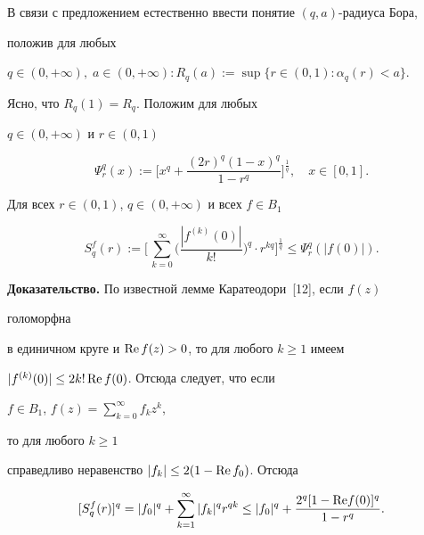 В связи с предложением естественно ввести понятие $(q,a)$-радиуса Бора,


положив для любых


$q\in(0, +\infty),\; a\in(0,+\infty):


R_q(a):=\sup\{r\in(0,1):\alpha_q(r)<a\}$.


Ясно, что $R_q(1)=R_q$. Положим для любых


$q\in(0,+\infty)$ и $r\in(0,1)$


$$


\Psi^{q}_{r}(x):=\bigg[x^q+\frac{(2r)^q(1-x)^q}{1-r^q}\bigg]^


{\frac{1}{q}}, \quad x\in[0,1].


$$





\begin{thm}


Для всех $r\in(0,1)$, $q\in(0,+\infty)$ и всех $f\in B_1$


\begin{equation}


S^f_q(r):=\bigg[\,\sum^{\infty}_{k=0}


\bigg(\frac{|f^{(k)}(0)|}{k!}\bigg)^{q}\cdot r^{kq}\bigg]^{\frac{1}{q}}


\leq\Psi^q_r(|f(0)|).


\end{equation}


\end{thm}





{\bf Доказательство.} По известной лемме Каратеодори~[12], если $f(z)$


голоморфна


в единичном круге и $\operatorname{Re} f(z)>0$, то для любого $k\geq 1$ имеем


$|f^{(k)}(0)|\leq 2k! \operatorname{Re} f(0)$. Отсюда следует, что если


$f\in B_1$, $f(z)=\sum\limits^{\infty}_{k=0}f_{k}z^k$,


то для любого $k\geq 1$


справедливо неравенство $|f_k|\leq 2(1-\operatorname{Re} f_0)$. Отсюда


$$


[S^{f}_{q}(r)]^q=|f_0|^q+\sum\limits^{\infty}_{k=1}|f_k|^qr^{qk}\leq


|f_0|^q+\frac{2^q[1-{\re}f(0)]^q}{1-r^q}.


$$





